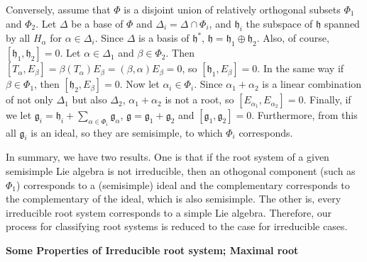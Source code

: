 \documentclass{article}
\newcommand{\lie}[1]{\mathfrak{#1}}
\begin{document}
Conversely, assume that $\Phi$ is a disjoint union of relatively orthogonal subsets $\Phi_1$ and $\Phi_2$.
Let $\Delta$ be a base of $\Phi$ and $\Delta_i = \Delta \cap \Phi_i$, and $\lie{h}_i$ the subspace of $\lie{h}$ spanned by all $H_\alpha$ for $\alpha \in \Delta_i$.
Since $\Delta$ is a basis of $\lie{h}^*$, $\lie{h} = \lie{h}_1 \oplus \lie{h}_2$.
Also, of course, $[\lie{h}_1, \lie{h}_2] = 0$.
Let $\alpha \in \Delta_1$ and $\beta \in \Phi_2$.
Then $[T_\alpha, E_\beta] = \beta(T_\alpha) E_\beta = (\beta, \alpha) E_\beta = 0$, so $[\lie{h}_1, E_\beta] = 0$.
In the same way if $\beta \in \Phi_1$, then $[\lie{h}_2, E_\beta] = 0$.
Now let $\alpha_i \in \Phi_i$.
Since $\alpha_1 + \alpha_2$ is a linear combination of not only $\Delta_1$ but also $\Delta_2$, $\alpha_1 + \alpha_2$ is not a root, so $[E_{\alpha_1}, E_{\alpha_2}] = 0$.
Finally, if we let $\lie{g}_i = \lie{h}_i + \sum_{\alpha \in \Phi_i} \lie{g}_\alpha$, $\lie{g} = \lie{g}_1 + \lie{g}_2$ and $[\lie{g}_1, \lie{g}_2] = 0$.
Furthermore, from this all $\lie{g}_i$ is an ideal, so they are semisimple, to which $\Phi_i$ corresponds.

In summary, we have two results.
One is that if the root system of a given semisimple Lie algebra is not irreducible, then an othogonal component (such as $\Phi_1$) corresponds to a (semisimple) ideal and the complementary corresponds to the complementary of the ideal, which is also semisimple.
The other is, every irreducible root system corresponds to a simple Lie algebra.
Therefore, our process for classifying root systems is reduced to the case for irreducible cases.

\newpage

\textbf{Some Properties of Irreducible root system; Maximal root}
\end{document}

